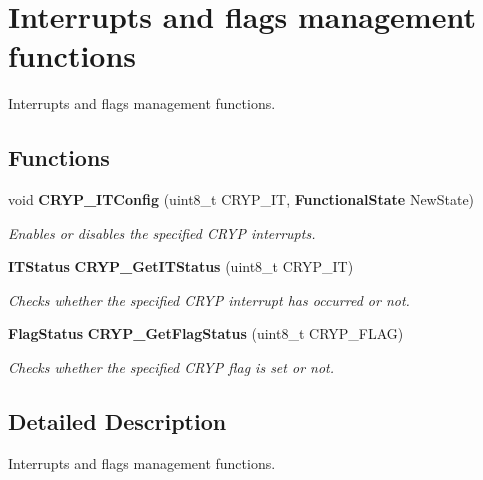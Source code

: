 \section{Interrupts and flags management functions}
\label{group__CRYP__Group5}


Interrupts and flags management functions.  


\subsection*{Functions}
\begin{DoxyCompactItemize}
\item 
void \textbf{ C\+R\+Y\+P\+\_\+\+I\+T\+Config} (uint8\+\_\+t C\+R\+Y\+P\+\_\+\+IT, \textbf{ Functional\+State} New\+State)
\begin{DoxyCompactList}\small\item\em Enables or disables the specified C\+R\+YP interrupts. \end{DoxyCompactList}\item 
\textbf{ I\+T\+Status} \textbf{ C\+R\+Y\+P\+\_\+\+Get\+I\+T\+Status} (uint8\+\_\+t C\+R\+Y\+P\+\_\+\+IT)
\begin{DoxyCompactList}\small\item\em Checks whether the specified C\+R\+YP interrupt has occurred or not. \end{DoxyCompactList}\item 
\textbf{ Flag\+Status} \textbf{ C\+R\+Y\+P\+\_\+\+Get\+Flag\+Status} (uint8\+\_\+t C\+R\+Y\+P\+\_\+\+F\+L\+AG)
\begin{DoxyCompactList}\small\item\em Checks whether the specified C\+R\+YP flag is set or not. \end{DoxyCompactList}\end{DoxyCompactItemize}


\subsection{Detailed Description}
Interrupts and flags management functions. 

